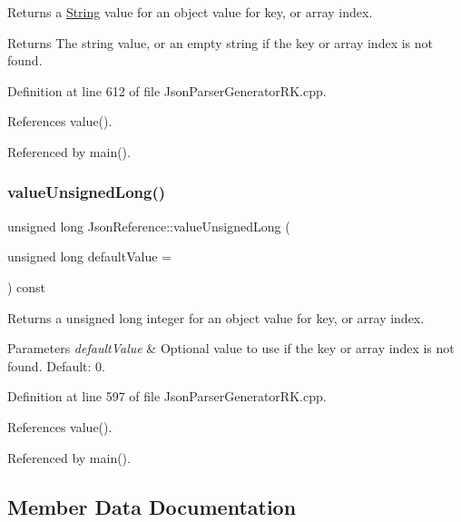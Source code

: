 Returns a \hyperlink{class_string}{String} value for an object value for key, or array index. 

\begin{DoxyReturn}{Returns}
The string value, or an empty string if the key or array index is not found. 
\end{DoxyReturn}


Definition at line 612 of file Json\+Parser\+Generator\+R\+K.\+cpp.



References value().



Referenced by main().

\mbox{\label{class_json_reference_a081b56c80097d802911610fb17253211}} 
\subsubsection{\texorpdfstring{value\+Unsigned\+Long()}{valueUnsignedLong()}}
{\footnotesize\ttfamily unsigned long Json\+Reference\+::value\+Unsigned\+Long (\begin{DoxyParamCaption}\item[{unsigned long}]{default\+Value = {} }\end{DoxyParamCaption}) const}



Returns a unsigned long integer for an object value for key, or array index. 


\begin{DoxyParams}{Parameters}
{\em default\+Value} & Optional value to use if the key or array index is not found. Default\+: 0. \\
\hline
\end{DoxyParams}


Definition at line 597 of file Json\+Parser\+Generator\+R\+K.\+cpp.



References value().



Referenced by main().



\subsection{Member Data Documentation}
\mbox{\label{class_json_reference_a37fb436fae63e7e452fc2325eddf3e8b}} 

